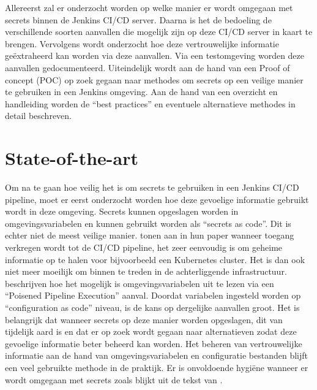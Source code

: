 Allereerst zal er onderzocht worden op welke manier er wordt omgegaan met secrets binnen de Jenkins CI/CD server. Daarna is het de bedoeling de verschillende soorten aanvallen die mogelijk zijn op deze CI/CD server in kaart te brengen. Vervolgens wordt onderzocht hoe deze vertrouwelijke informatie geëxtraheerd kan worden via deze aanvallen. Via een testomgeving worden deze aanvallen gedocumenteerd. Uiteindelijk wordt aan de hand van een Proof of concept (POC) op zoek gegaan naar methodes om secrets op een veilige manier te gebruiken in een Jenkins omgeving. Aan de hand van een overzicht en handleiding worden de “best practices” en eventuele alternatieve methodes in detail beschreven.

\section{State-of-the-art}%
\label{sec:state-of-the-art}

Om na te gaan hoe veilig het is om secrets te gebruiken in een Jenkins CI/CD pipeline, moet er eerst onderzocht worden hoe deze gevoelige informatie gebruikt wordt in deze omgeving. Secrets kunnen opgeslagen worden in omgevingsvariabelen en kunnen gebruikt worden als “secrets as code”. Dit is echter niet de meest veilige manier. \textcite{Pecka2022} tonen aan in hun paper wanneer toegang verkregen wordt tot de CI/CD pipeline, het zeer eenvoudig is om geheime informatie op te halen voor bijvoorbeeld een Kubernetes cluster. Het is dan ook niet meer moeilijk om binnen te treden in de achterliggende infrastructuur. \textcite{Gil} beschrijven hoe het mogelijk is omgevingsvariabelen uit te lezen via een “Poisened Pipeline Execution” aanval. Doordat variabelen ingesteld worden op “configuration as code” niveau, is de kans op dergelijke aanvallen groot. Het is belangrijk dat wanneer secrets op deze manier worden opgeslagen, dit van tijdelijk aard is en dat er op zoek wordt gegaan naar alternatieven zodat deze gevoelige informatie beter beheerd kan worden. Het beheren van vertrouwelijke informatie aan de hand van omgevingsvariabelen en configuratie bestanden blijft een veel gebruikte methode in de praktijk. Er is onvoldoende hygiëne wanneer er wordt omgegaan met secrets zoals blijkt uit de tekst van \autocite{Gil}. 

